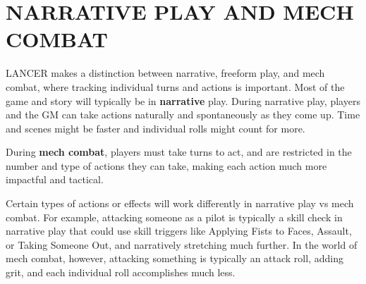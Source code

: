 \section{NARRATIVE PLAY AND MECH COMBAT}

LANCER makes a distinction between narrative, freeform play, and mech combat, where tracking
individual turns and actions is important. Most of the game and story will typically be in \textbf{narrative}
play. During narrative play, players and the GM can take actions naturally and spontaneously as
they come up. Time and scenes might be faster and individual rolls might count for more.

During \textbf{mech combat}, players must take turns to act, and are restricted in the number
and type of actions they can take, making each action much more impactful and tactical.

Certain types of actions or effects will work differently in narrative play vs mech combat.
For example, attacking someone as a pilot is typically a skill check in narrative play that could
use skill triggers like Applying Fists to Faces, Assault, or Taking Someone Out, and narratively
stretching much further. In the world of mech combat, however, attacking something is typically
an attack roll, adding grit, and each individual roll accomplishes much less.